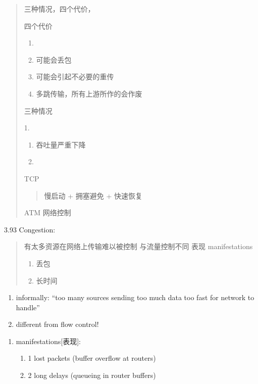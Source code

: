 \documentclass[
]{article}
\begin{document}
\begin{quote}
三种情况，四个代价，

四个代价

\begin{enumerate}
\def\labelenumi{\arabic{enumi}.}
\item
\item
  可能会丢包
\item
  可能会引起不必要的重传
\item
  多跳传输，所有上游所作的会作废
\end{enumerate}

三种情况

1.

\begin{enumerate}
\def\labelenumi{\arabic{enumi}.}
\item
  吞吐量严重下降
\item
\end{enumerate}

TCP

\begin{quote}
慢启动 + 拥塞避免 + 快速恢复
\end{quote}

ATM 网络控制
\end{quote}

3.93 Congestion:

\begin{quote}
有太多资源在网络上传输难以被控制 与流量控制不同 表现 manifestations

\begin{enumerate}
\def\labelenumi{\arabic{enumi}.}
\item
  丢包
\item
  长时间
\end{enumerate}
\end{quote}

\begin{enumerate}
\def\labelenumi{\arabic{enumi}.}
\item
  informally: ``too many sources sending too much data too fast for
  network to handle''
\item
  different from flow control!
\end{enumerate}

\begin{enumerate}
\def\labelenumi{\arabic{enumi}.}
\item
  manifestations{[}表现{]}:

  \begin{enumerate}
  \def\labelenumii{\arabic{enumii}.}
  \item
    1 lost packets (buffer overflow at routers)
  \item
    2 long delays (queueing in router buffers)
  \end{enumerate}
\end{enumerate}
\end{document}
